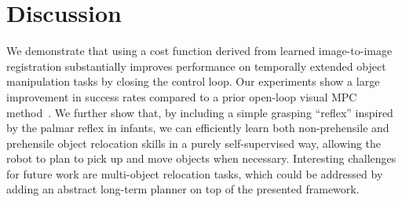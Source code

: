 \section{Discussion}

 We demonstrate that using a cost function derived from learned image-to-image registration substantially improves performance on temporally extended object manipulation tasks by closing the control loop. Our experiments show a large improvement in success rates compared to a prior open-loop visual MPC method~\cite{sna}. We further show that, by including a simple grasping ``reflex'' inspired by the palmar reflex in infants, we can efficiently learn both non-prehensile and prehensile object relocation skills in a purely self-supervised way, allowing the robot to plan to pick up and move objects when necessary.  
Interesting challenges for future work are multi-object relocation tasks, which could be addressed by adding an abstract long-term planner on top of the presented framework.
